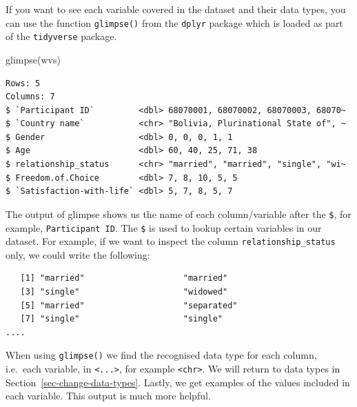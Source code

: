 \documentclass[
  letterpaper,
  DIV=11,
  numbers=noendperiod]{scrreprt}
\newenvironment{Shaded}{\begin{snugshade}}{\end{snugshade}}
\newcommand{\FunctionTok}[1]{\textcolor[rgb]{0.28,0.35,0.67}{#1}}
\newcommand{\NormalTok}[1]{\textcolor[rgb]{0.00,0.23,0.31}{#1}}
\newcommand{\SpecialCharTok}[1]{\textcolor[rgb]{0.37,0.37,0.37}{#1}}
\begin{document}
If you want to see each variable covered in the dataset and their data
types, you can use the function \texttt{glimpse()} from the
\texttt{dplyr} package which is loaded as part of the \texttt{tidyverse}
package.

\begin{Shaded}
\begin{Highlighting}[]
\FunctionTok{glimpse}\NormalTok{(wvs)}
\end{Highlighting}
\end{Shaded}

\begin{verbatim}
Rows: 5
Columns: 7
$ `Participant ID`         <dbl> 68070001, 68070002, 68070003, 68070~
$ `Country name`           <chr> "Bolivia, Plurinational State of", ~
$ Gender                   <dbl> 0, 0, 0, 1, 1
$ Age                      <dbl> 60, 40, 25, 71, 38
$ relationship_status      <chr> "married", "married", "single", "wi~
$ Freedom.of.Choice        <dbl> 7, 8, 10, 5, 5
$ `Satisfaction-with-life` <dbl> 5, 7, 8, 5, 7
\end{verbatim}

The output of glimpse shows us the name of each column/variable after
the \texttt{\$}, for example,
\texttt{\textasciigrave{}Participant\ ID\textasciigrave{}}. The
\texttt{\$} is used to lookup certain variables in our dataset. For
example, if we want to inspect the column \texttt{relationship\_status}
only, we could write the following:

\begin{Shaded}
\end{Shaded}

\begin{verbatim}
   [1] "married"                    "married"                   
   [3] "single"                     "widowed"                   
   [5] "married"                    "separated"                 
   [7] "single"                     "single"                    
....
\end{verbatim}

When using \texttt{glimpse()} we find the recognised data type for each
column, i.e.~each variable, in \texttt{\textless{}...\textgreater{}},
for example \texttt{\textless{}chr\textgreater{}}. We will return to
data types in Section~\ref{sec-change-data-types}. Lastly, we get
examples of the values included in each variable. This output is much
more helpful.
\end{document}
